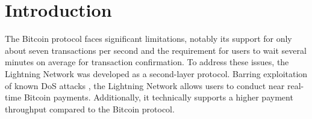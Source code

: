 \documentclass[10pt,twocolumn]{article}
\begin{document}


\section{Introduction}
The Bitcoin protocol faces significant limitations, notably its support for only about seven transactions per second and the requirement for users to wait several minutes on average for transaction confirmation. To address these issues, the Lightning Network was developed as a second-layer protocol. Barring exploitation of known DoS attacks \cite{harris2020flood,shikhelman2022unjamming,tochner2020route}, the Lightning Network allows users to conduct near real-time Bitcoin payments. Additionally, it technically supports a higher payment throughput compared to the Bitcoin protocol.
\end{document}
